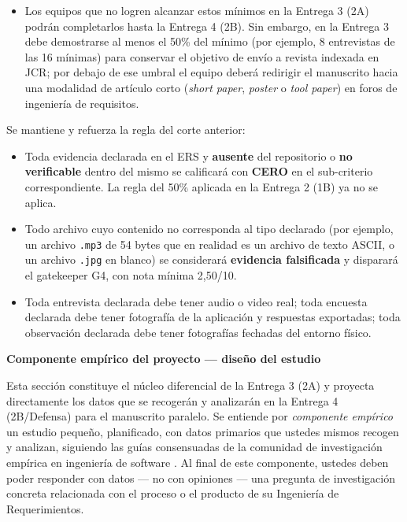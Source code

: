 \documentclass[11pt,a4paper]{article}
\newcounter{secc}
\newcommand{\secband}[1]{%
    \stepcounter{secc}\par\vspace{9pt}\noindent
    {\setlength{\fboxsep}{0pt}%
        \colorbox{uteqgold}{\parbox[c][20pt][c]{0.05\textwidth}{\centering\textbf{\color{white}\small \arabic{secc}}}}%
        \colorbox{uteqgreen}{\parbox[c][20pt][c]{0.95\textwidth}{\hspace{8pt}\textbf{\color{white}\small #1}}}%
    }\par\vspace{5pt}}
\begin{document}
\begin{notabox}[title=Justificación empírica de los mínimos --- alineación con las revistas indexadas en JCR de Ingeniería de Requerimientos]
\begin{itemize}
    \item Los equipos que no logren alcanzar estos mínimos en la Entrega 3 (2A) podrán completarlos hasta la Entrega 4 (2B). Sin embargo, en la Entrega 3 debe demostrarse al menos el 50\% del mínimo (por ejemplo, 8 entrevistas de las 16 mínimas) para conservar el objetivo de envío a revista indexada en JCR; por debajo de ese umbral el equipo deberá redirigir el manuscrito hacia una modalidad de artículo corto (\emph{short paper}, \emph{poster} o \emph{tool paper}) en foros de ingeniería de requisitos.
\end{itemize}
\end{notabox}

\begin{alertbox}[title=Regla estricta de evidencias --- vigente desde esta entrega]
Se mantiene y refuerza la regla del corte anterior:
\begin{itemize}
    \item Toda evidencia declarada en el ERS y \textbf{ausente} del repositorio o \textbf{no verificable} dentro del mismo se calificará con \textbf{CERO} en el sub-criterio correspondiente. La regla del 50\% aplicada en la Entrega 2 (1B) ya no se aplica.
    \item Todo archivo cuyo contenido no corresponda al tipo declarado (por ejemplo, un archivo \texttt{.mp3} de 54 bytes que en realidad es un archivo de texto ASCII, o un archivo \texttt{.jpg} en blanco) se considerará \textbf{evidencia falsificada} y disparará el gatekeeper G4, con nota mínima 2,50/10.
    \item Toda entrevista declarada debe tener audio o video real; toda encuesta declarada debe tener fotografía de la aplicación y respuestas exportadas; toda observación declarada debe tener fotografías fechadas del entorno físico.
\end{itemize}
\end{alertbox}

\secband{Componente empírico del proyecto --- diseño del estudio}

Esta sección constituye el núcleo diferencial de la Entrega 3 (2A) y proyecta directamente los datos que se recogerán y analizarán en la Entrega 4 (2B/Defensa) para el manuscrito paralelo.
Se entiende por \emph{componente empírico} un estudio pequeño, planificado, con datos primarios que ustedes mismos recogen y analizan, siguiendo las guías consensuadas de la comunidad de investigación empírica en ingeniería de software \cite{jedlitschka2008reporting,runeson2009guidelines,wohlin2012experimentation}.
Al final de este componente, ustedes deben poder responder con datos --- no con opiniones --- una pregunta de investigación concreta relacionada con el proceso o el producto de su Ingeniería de Requerimientos.
\end{document}
